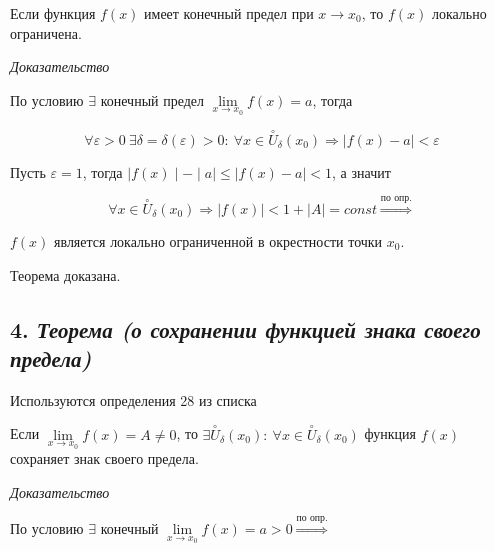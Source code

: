 Если функция $f(x)$ имеет конечный предел при $x \rightarrow x_0$, то $f(x)$ локально ограничена.
\vspace*{20pt} 

\textit{Доказательство}

По условию $\exists$ конечный предел $\lim\limits_{x \to x_0}f(x) = a$, тогда

$$
\forall {\varepsilon} > 0 \ \exists\delta=\delta({\varepsilon} )>0: \ \forall x \in \overset{\circ}U_\delta(x_0) \Rightarrow | f(x) - a|  < {\varepsilon}
$$

Пусть ${\varepsilon} = 1$, тогда $\mid  f(x)\mid   - \mid  a\mid   \leqslant \mid  f(x) - a\mid   < 1$, а значит

$$
\forall x \in \overset{\circ}U_\delta(x_0) \Rightarrow | f(x)|  <1 + | A|  = const \overset{\text{по опр.}}{\Rightarrow}$$

$f(x)$ является локально ограниченной в окрестности точки $x_0$.

Теорема доказана.
\newpage 
\subsection*{4. \textit{Теорема (о сохранении функцией знака своего предела)}}
\begin{Quote2} 
\small\centering 

Используются определения 28 из списка \end{Quote2} 

Если $\lim\limits_{x \to x_0} f(x) = A \neq 0$, то $\exists \overset{\circ}U_\delta(x_0): \ \forall x \in \overset{\circ}U_\delta(x_0)$ функция $f(x)$ сохраняет знак своего предела.
\vspace*{20pt} 

\textit{Доказательство}

По условию $\exists$ конечный $\lim\limits_{x \to x_0} f(x) = a > 0 \overset{\text{по опр.}}{\Rightarrow}$

